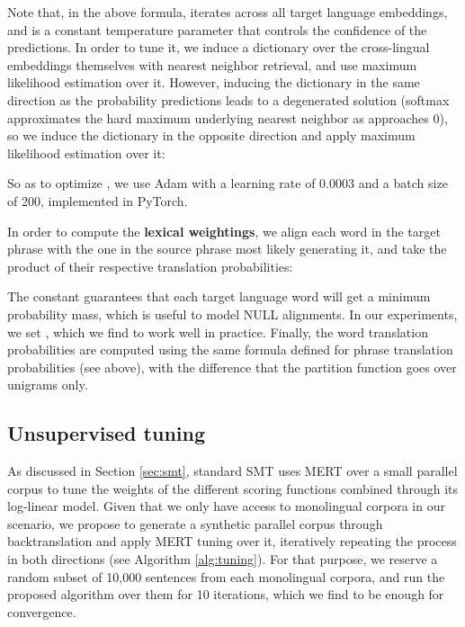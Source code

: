 \documentclass[11pt,a4paper]{article}
\begin{document}
Note that, in the above formula,  iterates across all target language embeddings, and  is a constant temperature parameter that controls the confidence of the predictions. In order to tune it, we induce a dictionary over the cross-lingual embeddings themselves with nearest neighbor retrieval, and use maximum likelihood estimation over it. However, inducing the dictionary in the same direction as the probability predictions leads to a degenerated solution (softmax approximates the hard maximum underlying nearest neighbor as  approaches 0), so we induce the dictionary in the opposite direction and apply maximum likelihood estimation over it:

So as to optimize , we use Adam with a learning rate of 0.0003 and a batch size of 200, implemented in PyTorch.

In order to compute the \textbf{lexical weightings}, we align each word in the target phrase with the one in the source phrase most likely generating it, and take the product of their respective translation probabilities:

The constant  guarantees that each target language word will get a minimum probability mass, which is useful to model NULL alignments. In our experiments, we set , which we find to work well in practice. Finally, the word translation probabilities  are computed using the same formula defined for phrase translation probabilities (see above), with the difference that the partition function goes over unigrams only.


\subsection{Unsupervised tuning} \label{subsec:tuning}

As discussed in Section \ref{sec:smt}, standard SMT uses MERT over a small parallel corpus to tune the weights of the different scoring functions combined through its log-linear model. Given that we only have access to monolingual corpora in our scenario, we propose to generate a synthetic parallel corpus through backtranslation \citep{sennrich2016improving} and apply MERT tuning over it, iteratively repeating the process in both directions (see Algorithm \ref{alg:tuning}). For that purpose, we reserve a random subset of 10,000 sentences from each monolingual corpora, and run the proposed algorithm over them for 10 iterations, which we find to be enough for convergence.
\end{document}
